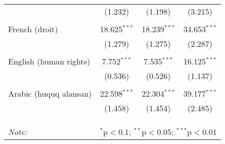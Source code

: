 \begin{table}[!htbp]
\begin{tabular}{@{\extracolsep{5pt}}lccc}
  & (1.232) & (1.198) & (3.215) \\ 
  & & & \\ 
 French (droit) & 18.625$^{***}$ & 18.239$^{***}$ & 34.653$^{***}$ \\ 
  & (1.279) & (1.275) & (2.287) \\ 
  & & & \\ 
 English (human rights) & 7.752$^{***}$ & 7.535$^{***}$ & 16.125$^{***}$ \\ 
  & (0.536) & (0.526) & (1.137) \\ 
  & & & \\ 
 Arabic (huquq alansan) & 22.598$^{***}$ & 22.304$^{***}$ & 39.177$^{***}$ \\ 
  & (1.458) & (1.454) & (2.485) \\ 
  & & & \\ 
\hline \\[-1.8ex] 
\hline 
\hline \\[-1.8ex] 
\textit{Note:}  & \multicolumn{3}{r}{$^{*}$p$<$0.1; $^{**}$p$<$0.05; $^{***}$p$<$0.01} \\ 
\end{tabular} 
\end{table} 
